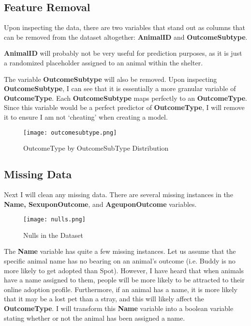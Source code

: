\documentclass[12pt]{article} %
\begin{document}
\subsection{Feature Removal} 

Upon inspecting the data, there are two variables that stand out as columns that can be removed from the dataset altogether: \textbf{AnimalID} and \textbf{OutcomeSubtype}. 

\textbf{AnimalID} will probably not be very useful for prediction purposes, as it is just a randomized placeholder assigned to an animal within the shelter. 

The variable \textbf{OutcomeSubtype} will also be removed. Upon inspecting \textbf{OutcomeSubtype}, I can see that it is essentially a more granular variable of \textbf{OutcomeType}. Each \textbf{OutcomeSubtype} maps perfectly to an \textbf{OutcomeType}. Since this variable would be a perfect predictor of \textbf{OutcomeType}, I will remove it to ensure I am not ‘cheating’ when creating a model. 

\newpage

\begin{figure}[!htb]
  \centering
  \texttt{[image: outcomesubtype.png]}                  
  \caption{OutcomeType by OutcomeSubType Distribution}
  \label{fig:OutcomeType}
\end{figure}

\newpage

\subsection{Missing Data} 
Next I will clean any missing data. There are several missing instances in the \textbf{Name, SexuponOutcome}, and \textbf{AgeuponOutcome} variables. 

\begin{figure}[!htb]
  \centering
  \texttt{[image: nulls.png]}                  
  \caption{Nulls in the Dataset}
  \label{fig:OutcomeType}
\end{figure}

The \textbf{Name} variable has quite a few missing instances. Let us assume that the specific animal name has no bearing on an animal’s outcome (i.e. Buddy is no more likely to get adopted than Spot). However, I have heard that when animals have a name assigned to them, people will be more likely to be attracted to their online adoption profile. Furthermore, if an animal has a name, it is more likely that it may be a lost pet than a stray, and this will likely affect the \textbf{OutcomeType}.  I will transform this \textbf{Name} variable into a boolean variable stating whether or not the animal has been assigned a name.
\end{document}
